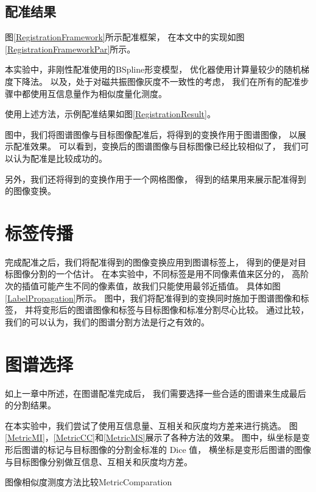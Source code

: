 \subsection{配准结果}
图\ref{RegistrationFramework}所示配准框架，
在本文中的实现如图\ref{RegistrationFrameworkPar}所示。


本实验中，非刚性配准使用的BSpline形变模型，
优化器使用计算量较少的随机梯度下降法。
以及，处于对磁共振图像灰度不一致性的考虑，
我们在所有的配准步骤中都使用互信息量作为相似度量化测度。

使用上述方法，示例配准结果如图\ref{RegistrationResult}。


图中，我们将图谱图像与目标图像配准后，将得到的变换作用于图谱图像，
以展示配准效果。
可以看到，变换后的图谱图像与目标图像已经比较相似了，
我们可以认为配准是比较成功的。

另外，我们还将得到的变换作用于一个网格图像，
得到的结果用来展示配准得到的图像变换。




\section{标签传播}
完成配准之后，我们将配准得到的图像变换应用到图谱标签上，
得到的便是对目标图像分割的一个估计。
在本实验中，不同标签是用不同像素值来区分的，
高阶次的插值可能产生不同的像素值，故我们只能使用最邻近插值。
具体如图\ref{LabelPropagation}所示。
图中，我们将配准得到的变换同时施加于图谱图像和标签，
并将变形后的图谱图像和标签与目标图像和标准分割尽心比较。
通过比较，我们的可以认为，我们的图谱分割方法是行之有效的。



\section{图谱选择}
如上一章中所述，在图谱配准完成后，
我们需要选择一些合适的图谱来生成最后的分割结果。

在本实验中，我们尝试了使用互信息量、互相关和灰度均方差来进行挑选。
图\ref{MetricMI}，\ref{MetricCC}和\ref{MetricMS}展示了各种方法的效果。
图中，纵坐标是变形后图谱的标记与目标图像的分割金标准的 Dice 值，
横坐标是变形后图谱的图像与目标图像分别做互信息、互相关和灰度均方差。
\begin{pics}[htbp]{图像相似度测度方法比较}{MetricComparation}
\end{pics}

